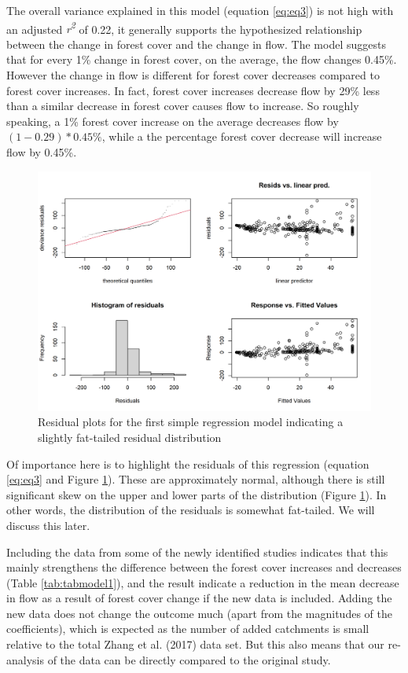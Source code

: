 \documentclass[]{elsarticle} %
\begin{document}
The overall variance explained in this model (equation \eqref{eq:eq3}) is not high with an adjusted \emph{r\textsuperscript{2}} of 0.22, it generally supports the hypothesized relationship between the change in forest cover and the change in flow. The model suggests that for every 1\% change in forest cover, on the average, the flow changes 0.45\%. However the change in flow is different for forest cover decreases compared to forest cover increases. In fact, forest cover increases decrease flow by 29\% less than a similar decrease in forest cover causes flow to increase. So roughly speaking, a 1\% forest cover increase on the average decreases flow by \((1 - 0.29)*0.45\%\), while a the percentage forest cover decrease will increase flow by 0.45\%.

\begin{figure}
\includegraphics[width=0.9\linewidth]{residual_plot_model1} \caption{Residual plots for the first simple regression model indicating a slightly fat-tailed residual distribution}\label{fig:gamcheck}
\end{figure}

Of importance here is to highlight the residuals of this regression (equation \eqref{eq:eq3} and Figure \ref{fig:gamcheck}). These are approximately normal, although there is still significant skew on the upper and lower parts of the distribution (Figure \ref{fig:gamcheck}). In other words, the distribution of the residuals is somewhat fat-tailed. We will discuss this later.

Including the data from some of the newly identified studies indicates that this mainly strengthens the difference between the forest cover increases and decreases (Table \ref{tab:tabmodel1}), and the result indicate a reduction in the mean decrease in flow as a result of forest cover change if the new data is included. Adding the new data does not change the outcome much (apart from the magnitudes of the coefficients), which is expected as the number of added catchments is small relative to the total Zhang et al. (2017) data set. But this also means that our re-analysis of the data can be directly compared to the original study.
\end{document}
